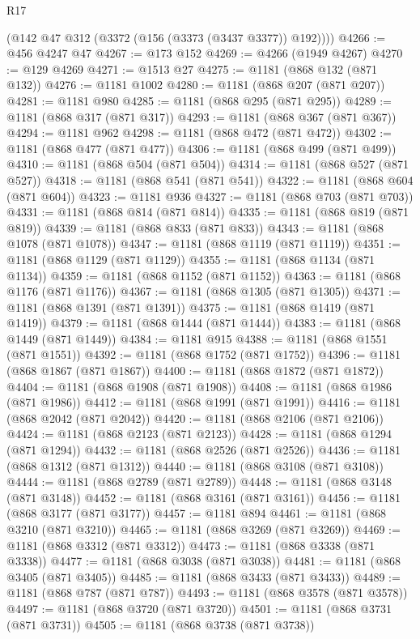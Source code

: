 \begin{lexlean}{R17}
\begin{coremodule}
      (@142 @47 @312 (@3372 (@156 (@3373 (@3437 @3377)) @192))))
@4266 := @456 @4247 @47
@4267 := @173 @152
@4269 := @4266 (@1949 @4267)
@4270 := @129 @4269
@4271 := @1513 @27
@4275 := @1181 (@868 @132 (@871 @132))
@4276 := @1181 @1002
@4280 := @1181 (@868 @207 (@871 @207))
@4281 := @1181 @980
@4285 := @1181 (@868 @295 (@871 @295))
@4289 := @1181 (@868 @317 (@871 @317))
@4293 := @1181 (@868 @367 (@871 @367))
@4294 := @1181 @962
@4298 := @1181 (@868 @472 (@871 @472))
@4302 := @1181 (@868 @477 (@871 @477))
@4306 := @1181 (@868 @499 (@871 @499))
@4310 := @1181 (@868 @504 (@871 @504))
@4314 := @1181 (@868 @527 (@871 @527))
@4318 := @1181 (@868 @541 (@871 @541))
@4322 := @1181 (@868 @604 (@871 @604))
@4323 := @1181 @936
@4327 := @1181 (@868 @703 (@871 @703))
@4331 := @1181 (@868 @814 (@871 @814))
@4335 := @1181 (@868 @819 (@871 @819))
@4339 := @1181 (@868 @833 (@871 @833))
@4343 := @1181 (@868 @1078 (@871 @1078))
@4347 := @1181 (@868 @1119 (@871 @1119))
@4351 := @1181 (@868 @1129 (@871 @1129))
@4355 := @1181 (@868 @1134 (@871 @1134))
@4359 := @1181 (@868 @1152 (@871 @1152))
@4363 := @1181 (@868 @1176 (@871 @1176))
@4367 := @1181 (@868 @1305 (@871 @1305))
@4371 := @1181 (@868 @1391 (@871 @1391))
@4375 := @1181 (@868 @1419 (@871 @1419))
@4379 := @1181 (@868 @1444 (@871 @1444))
@4383 := @1181 (@868 @1449 (@871 @1449))
@4384 := @1181 @915
@4388 := @1181 (@868 @1551 (@871 @1551))
@4392 := @1181 (@868 @1752 (@871 @1752))
@4396 := @1181 (@868 @1867 (@871 @1867))
@4400 := @1181 (@868 @1872 (@871 @1872))
@4404 := @1181 (@868 @1908 (@871 @1908))
@4408 := @1181 (@868 @1986 (@871 @1986))
@4412 := @1181 (@868 @1991 (@871 @1991))
@4416 := @1181 (@868 @2042 (@871 @2042))
@4420 := @1181 (@868 @2106 (@871 @2106))
@4424 := @1181 (@868 @2123 (@871 @2123))
@4428 := @1181 (@868 @1294 (@871 @1294))
@4432 := @1181 (@868 @2526 (@871 @2526))
@4436 := @1181 (@868 @1312 (@871 @1312))
@4440 := @1181 (@868 @3108 (@871 @3108))
@4444 := @1181 (@868 @2789 (@871 @2789))
@4448 := @1181 (@868 @3148 (@871 @3148))
@4452 := @1181 (@868 @3161 (@871 @3161))
@4456 := @1181 (@868 @3177 (@871 @3177))
@4457 := @1181 @894
@4461 := @1181 (@868 @3210 (@871 @3210))
@4465 := @1181 (@868 @3269 (@871 @3269))
@4469 := @1181 (@868 @3312 (@871 @3312))
@4473 := @1181 (@868 @3338 (@871 @3338))
@4477 := @1181 (@868 @3038 (@871 @3038))
@4481 := @1181 (@868 @3405 (@871 @3405))
@4485 := @1181 (@868 @3433 (@871 @3433))
@4489 := @1181 (@868 @787 (@871 @787))
@4493 := @1181 (@868 @3578 (@871 @3578))
@4497 := @1181 (@868 @3720 (@871 @3720))
@4501 := @1181 (@868 @3731 (@871 @3731))
@4505 := @1181 (@868 @3738 (@871 @3738))

\end{coremodule}
\end{lexlean}
